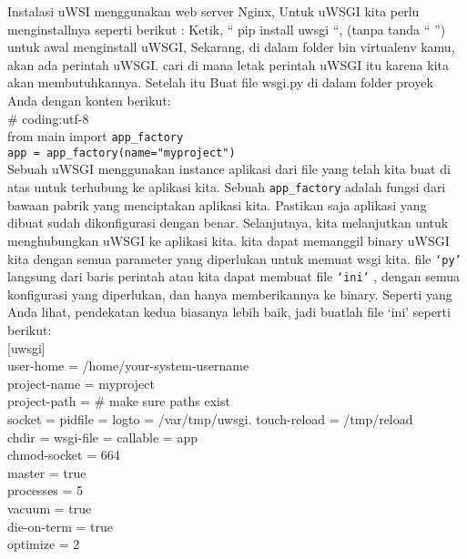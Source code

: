 	Instalasi uWSI menggunakan web server Nginx, Untuk uWSGI kita perlu menginstallnya seperti berikut :
Ketik, “ pip install uwsgi “, (tanpa tanda “ ”) untuk awal menginstall uWSGI,
Sekarang, di dalam folder bin virtualenv kamu, akan ada perintah uWSGI. cari
di mana letak perintah uWSGI itu karena kita akan membutuhkannya. Setelah itu
Buat file wsgi.py di dalam folder proyek Anda dengan konten berikut:\\
\# coding:utf-8\\
from main import \verb|app_factory|\\
\verb|app = app_factory(name="myproject")|\\
	
	Sebuah uWSGI menggunakan instance aplikasi dari file yang telah kita buat di atas untuk terhubung ke aplikasi kita. Sebuah \verb|app_factory| adalah fungsi dari bawaan pabrik yang menciptakan aplikasi kita. Pastikan saja aplikasi yang dibuat sudah dikonfigurasi dengan benar. Selanjutnya, kita melanjutkan untuk menghubungkan uWSGI ke aplikasi kita. kita dapat memanggil binary uWSGI kita dengan semua parameter yang diperlukan untuk memuat wsgi kita. file \verb|‘py’| langsung dari baris perintah atau kita dapat membuat file \verb|‘ini’| , dengan semua konfigurasi yang diperlukan, dan hanya memberikannya ke binary. Seperti yang Anda lihat, pendekatan kedua biasanya lebih baik, jadi buatlah file ‘ini’ seperti berikut:\\

[uwsgi]\\
user-home = /home/your-system-username\\
project-name = myproject\\
project-path = %
\# make sure paths exist\\
socket = %
pidfile = %
logto = /var/tmp/uwsgi.%
touch-reload = /tmp/reload\\
chdir = %
wsgi-file = %
callable = app\\
chmod-socket = 664\\
master = true\\
processes = 5\\
vacuum = true\\
die-on-term = true\\
optimize = 2\\


